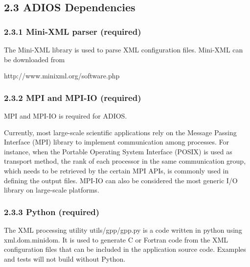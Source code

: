 \vspace{22pt}
\subsection*{{\large 2.3 }{\large \textbf{ADIOS Dependencies\label{HToc84890226}\label{HToc212016601}\label{HToc212016843}\label{HToc182553335}}}}

\vspace{10pt}
\subsubsection*{{\large \textbf{2.3.1 Mini-XML parser (required)}}}

\vspace{10pt}
The Mini-XML library is used to parse XML configuration files. Mini-XML can be 
downloaded from 

\vspace{10pt}
http://www.minixml.org/software.php\label{HToc84890229}\label{HToc212016604}\label{HToc212016846}\label{HToc182553336}

\vspace{10pt}
\subsubsection*{{\large \textbf{2.3.2 MPI and MPI-IO (required)}}}

\vspace{10pt}
MPI and MPI-IO is required for ADIOS.

\vspace{10pt}
Currently, most large-scale scientific applications rely on the Message Passing 
Interface (MPI) library to implement communication among processes. For instance, 
when the Portable Operating System Interface (POSIX) is used as transport method, 
the rank of each processor in the same communication group, which needs to be retrieved 
by the certain MPI APIs, is commonly used in defining the output files. MPI-IO 
can also be considered the most generic I/O library on large-scale platforms. \label{HToc84890230}\label{HToc212016605}\label{HToc212016847}\label{HToc182553337}

\vspace{10pt}
\subsubsection*{{\large \textbf{2.3.3 Python (required)}}}

\vspace{10pt}
The XML processing utility utils/gpp/gpp.py is a code written in python using xml.dom.minidom. 
It is used to generate C or Fortran code from the XML configuration files that 
can be included in the application source code.  Examples and tests will not build 
without Python. \label{HToc182553338}

